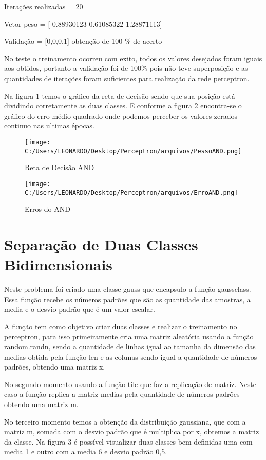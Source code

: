 \documentclass[
12pt, 
a4paper,
oneside,			%
english,			%
french,				%
spanish,			%
brazil,	
]{abntex2}
\begin{document}
Iterações realizadas = 20

Vetor peso =  [ 0.88930123  0.61085322  1.28871113] 

Validação = [0,0,0,1] obtenção de 100 \% de acerto

No teste o treinamento ocorreu com exito, todos os valores desejados foram iguais aos obtidos, portanto a validação foi de 100\% pois não teve superposição e as quantidades de iterações foram suficientes para realização da rede perceptron. 

Na figura 1 temos o gráfico da reta de decisão sendo que sua posição está dividindo corretamente as duas classes. E conforme a figura 2 encontra-se o gráfico do erro  médio quadrado onde podemos perceber os valores zerados continuo nas ultimas épocas. 
 
\begin{figure}
	\centering
	\texttt{[image: C:/Users/LEONARDO/Desktop/Perceptron/arquivos/PessoAND.png]}
	\caption{Reta de Decisão AND}
\end{figure}

\begin{figure}
	\centering
	\texttt{[image: C:/Users/LEONARDO/Desktop/Perceptron/arquivos/ErroAND.png]}
	\caption{Erros do AND}
\end{figure}

\section{Separação de Duas Classes Bidimensionais}

Neste problema foi criado uma classe gauss que encapsulo a função gaussclass. Essa função recebe os números padrões que são as quantidade das amostras, a media e o desvio padrão que é um valor escalar. 

A função tem como objetivo criar duas classes e realizar o treinamento no perceptron, para isso primeiramente cria uma matriz aleatória usando a função random.randn, sendo a quantidade de linhas igual ao tamanha da dimensão das medias obtida pela função len e as colunas sendo igual a quantidade de números padrões, obtendo uma matriz x. 

No segundo momento usando a função tile que faz a replicação de matriz. Neste caso a função replica a matriz medias pela quantidade de números padrões obtendo uma matriz m.

No terceiro momento temos a obtenção da distribuição gaussiana, que com a matriz m, somada com o desvio padrão que é multiplica por x, obtemos a matriz da classe. Na figura 3 é possível visualizar duas classes bem definidas uma com media 1 e outro com a media 6 e desvio padrão 0,5.    
\end{document}
